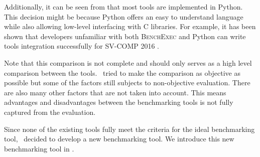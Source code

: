 Additionally, it can be seen from  that most tools are implemented in Python.
This decision might be because Python offers an easy to understand language while also allowing low-level interfacing with C libraries.
For example, it has been shown that developers unfamiliar with both \textsc{BenchExec} and Python can write tools integration successfully for SV-COMP 2016 \citep{beyerReliableBenchmarkingRequirements2019}.

Note that this comparison is not complete and should only serves as a high level comparison between the tools.
\First~tried to make the comparison as objective as possible but some of the factors still subjects to non-objective evaluation.
There are also many other factors that are not taken into account.
This means advantages and disadvantages between the benchmarking tools is not fully captured from the evaluation.

Since none of the existing tools fully meet the criteria for the ideal benchmarking tool, \first~decided to develop a new benchmarking tool.
We introduce this new benchmarking tool in .

